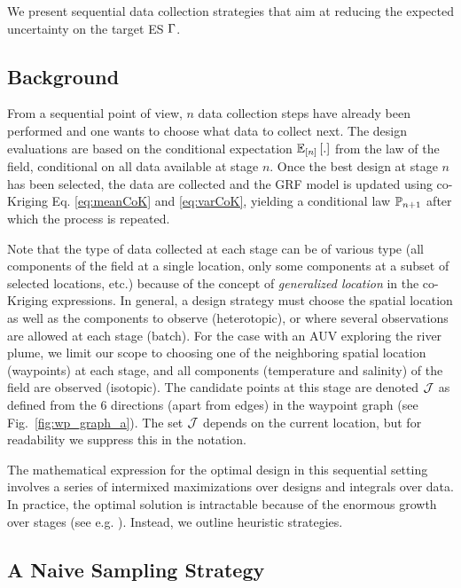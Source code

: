 \documentclass[aoas,preprint]{imsart}
\begin{document}
We present sequential data collection
strategies that aim at reducing the expected uncertainty on the target
ES $\Gamma$.

\subsection{Background}

From a sequential point of view, $n$ data collection steps have
already been performed and one wants to choose what data to collect
next. The design evaluations
are based on the conditional expectation $\mathbb{E}_{[n]} \left[.\right]$ from the law
of the field, conditional on all data available at
stage $n$.
Once the best design at stage $n$
has been selected, the data are collected and the GRF
model is updated using co-Kriging
Eq. \ref{eq:meanCoK} and \ref{eq:varCoK}, yielding a conditional law $\mathbb{P}_{n + 1}$
after which the process is repeated.

Note that the type of data collected at each stage can be of various
type (all components of the field at a single location, only some
components at a subset of selected locations, etc.) because of the
concept of \textit{generalized location} in the co-Kriging expressions.
In general, a design strategy must choose the spatial location as well
as the components to observe (heterotopic), or where several
observations are allowed at each stage (batch).  For the case with an
AUV exploring the river plume, we limit our scope to choosing one of
the neighboring spatial location (waypoints) at each stage, and all
components (temperature and salinity) of the field are observed
(isotopic). The candidate points at this stage are denoted
$\mathcal{J}$ as defined from the 6 directions (apart from edges) in
the waypoint graph (see Fig.~\ref{fig:wp_graph_a}). The
set $\mathcal{J}$ depends on the current location, but for readability
we suppress this in the notation.

The mathematical expression for the optimal design in this sequential
setting involves a series of intermixed maximizations over designs and
integrals over data. In practice, the optimal solution is intractable
because of the enormous growth over stages (see
e.g. \cite{powell2016perspectives}).
Instead, we outline heuristic strategies.


\subsection{A Naive Sampling Strategy}
\label{naive}
\end{document}
